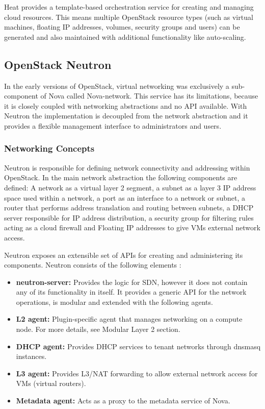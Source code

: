 Heat provides a template-based orchestration service for creating and managing cloud resources. This means multiple OpenStack resource types (such as virtual machines, floating IP addresses, volumes, security groups and users) can be generated and also maintained with additional functionality like auto-scaling.


\subsection{OpenStack Neutron}

In the early versions of OpenStack, virtual networking was exclusively a sub-component of Nova called Nova-network. This service has its limitations, because it is closely coupled with networking abstractions and no API available. With Neutron the implementation is decoupled from the network abstraction and it provides a flexible management interface to administrators and users.


\subsubsection{Networking Concepts}

Neutron is responsible for defining network connectivity and addressing within OpenStack. In the main network abstraction the following components are defined:
A network as a virtual layer 2 segment, a subnet as a layer 3 IP address space used within a network, a port as an interface to a network or subnet, a router that performs address translation and routing between subnets, a DHCP server responsible for IP address distribution, a security group for filtering rules acting as a cloud firewall and Floating IP addresses to give VMs external network access.

\newpage
Neutron exposes an extensible set of APIs for creating and administering its components. Neutron consists of the following elements \cite{openstack-training}:

\begin{itemize}
\item \textbf{neutron-server:} Provides the logic for SDN, however it does not contain any of its functionality in itself. It provides a generic API for the network operations, is modular and extended with the following agents.
\item \textbf{L2 agent:} Plugin-specific agent that manages networking on a compute node. For more details, see Modular Layer 2 section.
\item \textbf{DHCP agent:} Provides DHCP services to tenant networks through dnsmasq instances.
\item \textbf{L3 agent:} Provides L3/NAT forwarding to allow external network access for VMs (virtual routers).
\item \textbf{Metadata agent:} Acts as a proxy to the metadata service of Nova.
\end{itemize}

